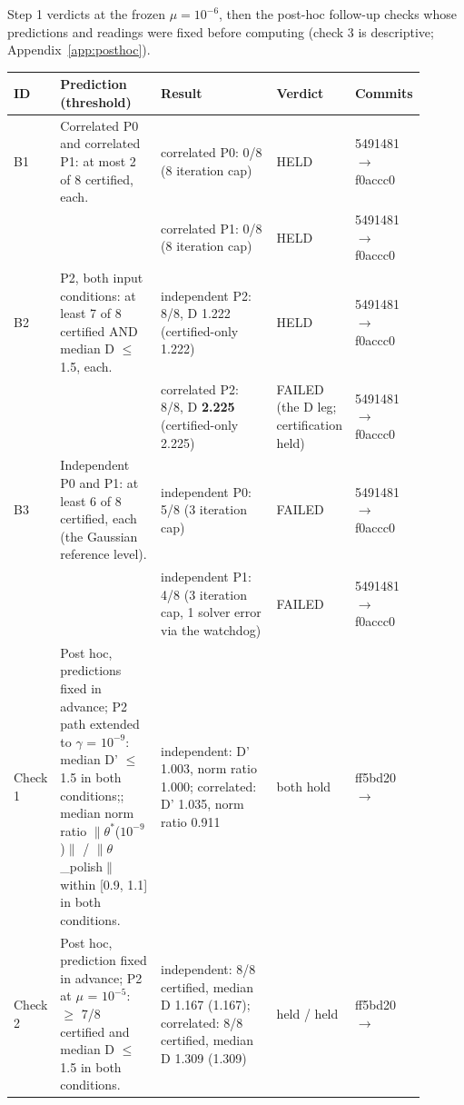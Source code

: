 Step 1 verdicts at the frozen $\mu = 10^{-6}$, then the post-hoc follow-up checks whose predictions and readings were fixed before computing (check 3 is descriptive; Appendix~\ref{app:posthoc}).

{\footnotesize\setlength{\tabcolsep}{3pt}
\begin{longtable}{R{0.07\linewidth} R{0.28\linewidth} R{0.35\linewidth} R{0.09\linewidth} R{0.11\linewidth}}
\toprule
ID & Prediction (threshold) & Result & Verdict & Commits \\
\midrule
\endhead
B1 & Correlated P0 and correlated P1: at most 2 of 8 certified, each. & correlated P0: 0/8 (8 iteration cap) & HELD & 5491481$\to$\allowbreak f0accc0 \\
 &  & correlated P1: 0/8 (8 iteration cap) & HELD & 5491481$\to$\allowbreak f0accc0 \\
B2 & P2, both input conditions: at least 7 of 8 certified AND median D $\leq$ 1.5, each. & independent P2: 8/8, D 1.222 (certified-only 1.222) & HELD & 5491481$\to$\allowbreak f0accc0 \\
 &  & correlated P2: 8/8, D \textbf{2.225} (certified-only 2.225) & FAILED (the D leg; certification held) & 5491481$\to$\allowbreak f0accc0 \\
B3 & Independent P0 and P1: at least 6 of 8 certified, each (the Gaussian reference level). & independent P0: 5/8 (3 iteration cap) & FAILED & 5491481$\to$\allowbreak f0accc0 \\
 &  & independent P1: 4/8 (3 iteration cap, 1 solver error via the watchdog) & FAILED & 5491481$\to$\allowbreak f0accc0 \\
Check 1 & Post hoc, predictions fixed in advance; P2 path extended to $\gamma$ = $10^{-9}$: median D' $\leq$ 1.5 in both conditions;; median norm ratio $\|\theta^{*}$($10^{-9}$)$\|$ / $\|\theta$\_polish$\|$ within [0.9, 1.1] in both conditions. & independent: D' 1.003, norm ratio 1.000; correlated: D' 1.035, norm ratio 0.911 & both hold & ff5bd20$\to$ \\
Check 2 & Post hoc, prediction fixed in advance; P2 at $\mu$ = $10^{-5}$: $\geq$ 7/8 certified and median D $\leq$ 1.5 in both conditions. & independent: 8/8 certified, median D 1.167 (1.167); correlated: 8/8 certified, median D 1.309 (1.309) & held / held & ff5bd20$\to$ \\
\bottomrule
\end{longtable}}